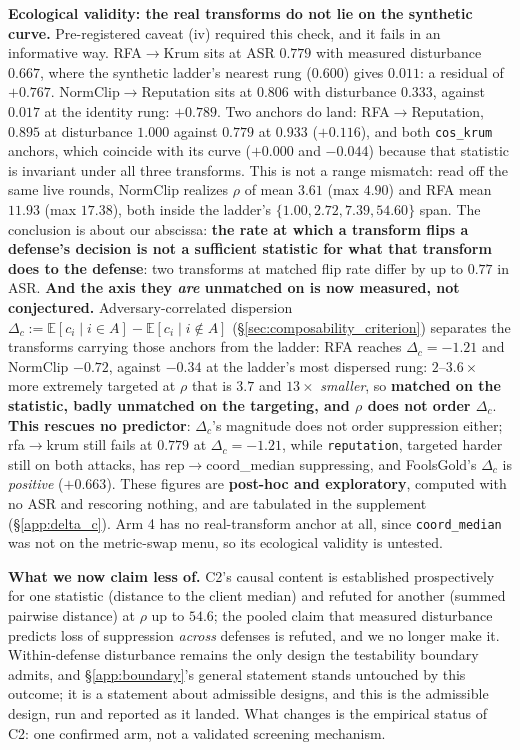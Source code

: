 \documentclass{article}
\begin{document}
\textbf{Ecological validity: the real transforms do not lie on the synthetic curve.} Pre-registered caveat (iv) required this check, and it fails in an informative way. RFA$\to$Krum sits at ASR $0.779$ with measured disturbance $0.667$, where the synthetic ladder's nearest rung ($0.600$) gives $0.011$: a residual of $+0.767$. NormClip$\to$Reputation sits at $0.806$ with disturbance $0.333$, against $0.017$ at the identity rung: $+0.789$. Two anchors do land: RFA$\to$Reputation, $0.895$ at disturbance $1.000$ against $0.779$ at $0.933$ ($+0.116$), and both \texttt{cos\_krum} anchors, which coincide with its curve ($+0.000$ and $-0.044$) because that statistic is invariant under all three transforms. This is not a range mismatch: read off the same live rounds, NormClip realizes $\rho$ of mean $3.61$ (max $4.90$) and RFA mean $11.93$ (max $17.38$), both inside the ladder's $\{1.00, 2.72, 7.39, 54.60\}$ span. The conclusion is about our abscissa: \textbf{the rate at which a transform flips a defense's decision is not a sufficient statistic for what that transform does to the defense}: two transforms at matched flip rate differ by up to $0.77$ in ASR. \textbf{And the axis they \emph{are} unmatched on is now measured, not conjectured.} Adversary-correlated dispersion $\Delta_c := \mathbb{E}[c_i \mid i \in A] - \mathbb{E}[c_i \mid i \notin A]$ (§\ref{sec:composability_criterion}) separates the transforms carrying those anchors from the ladder: RFA reaches $\Delta_c = -1.21$ and NormClip $-0.72$, against $-0.34$ at the ladder's most dispersed rung: $2$--$3.6\times$ more extremely targeted at $\rho$ that is $3.7$ and $13\times$ \emph{smaller}, so \textbf{matched on the statistic, badly unmatched on the targeting, and $\rho$ does not order $\Delta_c$}. \textbf{This rescues no predictor}: $\Delta_c$'s magnitude does not order suppression either; rfa$\to$krum still fails at $0.779$ at $\Delta_c = -1.21$, while \texttt{reputation}, targeted harder still on both attacks, has rep$\to$coord\_median suppressing, and FoolsGold's $\Delta_c$ is \emph{positive} ($+0.663$). These figures are \textbf{post-hoc and exploratory}, computed with no ASR and rescoring nothing, and are tabulated in the supplement (§\ref{app:delta_c}). Arm 4 has no real-transform anchor at all, since \texttt{coord\_median} was not on the metric-swap menu, so its ecological validity is untested.

\textbf{What we now claim less of.} C2's causal content is established prospectively for one statistic (distance to the client median) and refuted for another (summed pairwise distance) at $\rho$ up to $54.6$; the pooled claim that measured disturbance predicts loss of suppression \emph{across} defenses is refuted, and we no longer make it. Within-defense disturbance remains the only design the testability boundary admits, and §\ref{app:boundary}'s general statement stands untouched by this outcome; it is a statement about admissible designs, and this is the admissible design, run and reported as it landed. What changes is the empirical status of C2: one confirmed arm, not a validated screening mechanism.
\end{document}
